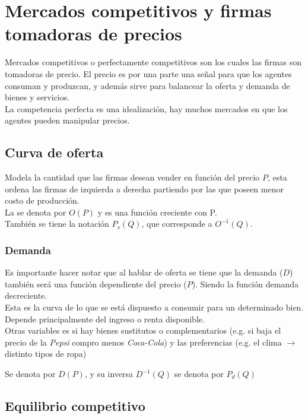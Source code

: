 \section{Mercados competitivos y firmas tomadoras de precios}

Mercados competitivos o perfectamente competitivos son los cuales las firmas son tomadoras de precio. El precio es por una parte una señal para que los agentes consuman y produzcan, y además sirve para balancear la oferta y demanda de bienes y servicios.\\

La competencia perfecta es una idealización, hay muchos mercados en que los agentes pueden manipular precios.


\subsection{Curva de oferta}

Modela la cantidad que las firmas desean vender en función del precio $P$, esta ordena las firmas de izquierda a derecha partiendo por las que poseen menor costo de producción.\\

La  se denota por $O(P)$ y es una función creciente con P.\\

También se tiene la notación $P_s(Q)$, que corresponde a $O^{-1}(Q)$.

\subsubsection{Demanda}
Es importante hacer notar que al hablar de oferta se tiene que la demanda ($D$) también será una función dependiente del precio ($P$). Siendo la función demanda decreciente.\\

Esta es la curva de lo que se está dispuesto a consumir para un determinado bien.\\

Depende principalmente del ingreso o renta disponible.\\
Otras variables es si hay bienes sustitutos o complementarios (e.g. si baja el precio de la \textit{Pepsi} compro menos \textit{Coca-Cola}) y las preferencias (e.g. el clima $\to$ distinto tipos de ropa)

Se denota por $D(P)$, y su inversa $D^{-1}(Q)$ se denota por $P_d(Q)$

\subsection{Equilibrio competitivo}

